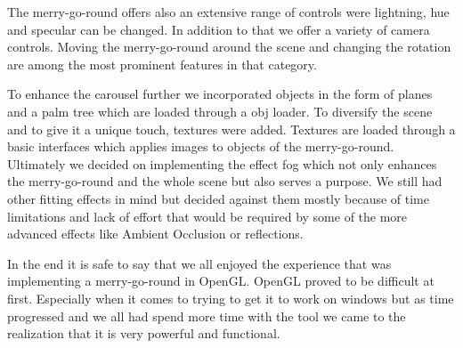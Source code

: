 \documentclass{report}
\begin{document}
The merry-go-round offers also an extensive range of controls were lightning, hue and specular can be changed. In addition to that we offer a variety of camera controls. Moving the merry-go-round around the scene and changing the rotation are among the most prominent features in that category.
\par
To enhance the carousel further we incorporated objects in the form of planes and a palm tree which are loaded through a obj loader. To diversify the scene and to give it a unique touch, textures were added. Textures are loaded through a basic interfaces which applies images to objects of the merry-go-round.
\pagebreak
Ultimately we decided on implementing the effect fog which not only enhances the merry-go-round and the whole scene but also serves a purpose. We still had other fitting effects in mind but decided against them mostly because of time limitations and lack of effort that would be required by some of the more advanced effects like Ambient Occlusion or reflections.  
\par
In the end it is safe to say that we all enjoyed the experience that was implementing a merry-go-round in OpenGL. OpenGL proved to be difficult at first. Especially when it comes to trying to get it to work on windows but as time progressed and we all had spend more time with the tool we came to the realization that it is very powerful and functional.
\end{document}
